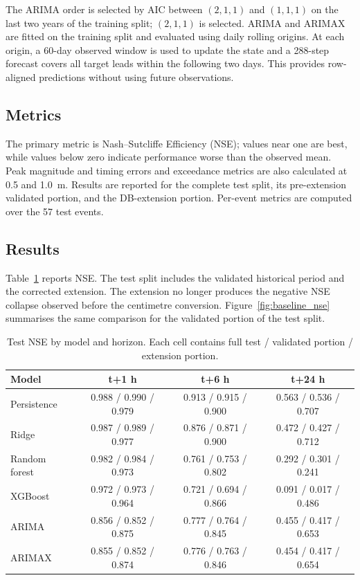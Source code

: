 \documentclass[twocolumn,twoside,a4paper,10pt]{IEEEtran}
\begin{document}
The ARIMA order is selected by AIC between $(2,1,1)$ and $(1,1,1)$ on the
last two years of the training split; $(2,1,1)$ is selected. ARIMA and ARIMAX
are fitted on the training split and evaluated using daily rolling origins.
At each origin, a 60-day observed window is used to update the state and a
288-step forecast covers all target leads within the following two days. This
provides row-aligned predictions without using future observations.

\subsection{Metrics}

The primary metric is Nash--Sutcliffe Efficiency (NSE); values near one are
best, while values below zero indicate performance worse than the observed
mean. Peak magnitude and timing errors and exceedance metrics are also
calculated at 0.5 and 1.0~m. Results are reported for the complete
test split, its pre-extension validated portion, and the DB-extension
portion. Per-event metrics are computed over the 57 test events.

\subsection{Results}

Table~\ref{tab:test_nse} reports NSE. The test split includes the validated
historical period and the corrected extension. The extension no longer
produces the negative NSE collapse observed before the centimetre conversion.
Figure~\ref{fig:baseline_nse} summarises the same comparison for the
validated portion of the test split.

\begin{table}[!t]
    \caption{Test NSE by model and horizon. Each cell contains full test /
    validated portion / extension portion.}
    \label{tab:test_nse}
    \centering
    \scriptsize
    \setlength{\tabcolsep}{3pt}
    \begin{tabular}{@{}lccc@{}}
        \toprule
        \textbf{Model} & \textbf{t+1 h} & \textbf{t+6 h} & \textbf{t+24 h} \\
        \midrule
        Persistence & 0.988 / 0.990 / 0.979 & 0.913 / 0.915 / 0.900 &
        0.563 / 0.536 / 0.707 \\
        Ridge & 0.987 / 0.989 / 0.977 & 0.876 / 0.871 / 0.900 &
        0.472 / 0.427 / 0.712 \\
        Random forest & 0.982 / 0.984 / 0.973 & 0.761 / 0.753 / 0.802 &
        0.292 / 0.301 / 0.241 \\
        XGBoost & 0.972 / 0.973 / 0.964 & 0.721 / 0.694 / 0.866 &
        0.091 / 0.017 / 0.486 \\
        ARIMA & 0.856 / 0.852 / 0.875 & 0.777 / 0.764 / 0.845 &
        0.455 / 0.417 / 0.653 \\
        ARIMAX & 0.855 / 0.852 / 0.874 & 0.776 / 0.763 / 0.846 &
        0.454 / 0.417 / 0.654 \\
        \bottomrule
    \end{tabular}
\end{table}
\end{document}
